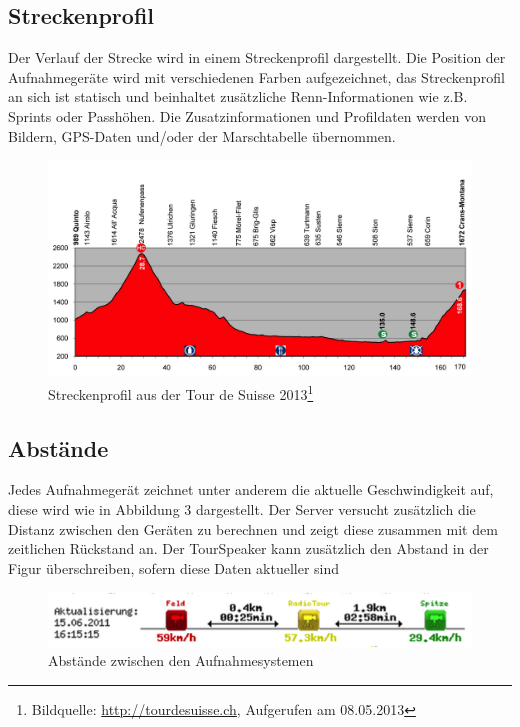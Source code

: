 \subsection{Streckenprofil}
Der Verlauf der Strecke wird in einem Streckenprofil dargestellt. Die Position der Aufnahmegeräte wird mit verschiedenen Farben aufgezeichnet, das Streckenprofil an sich ist statisch und beinhaltet zusätzliche Renn-Informationen wie z.B. Sprints oder Passhöhen. Die Zusatzinformationen und Profildaten werden von Bildern, GPS-Daten und/oder der Marschtabelle übernommen.
\begin{figure}[H]
	\centering
	\includegraphics[width=130mm]{images/streckenprofil.jpg}
	\caption{Streckenprofil aus der Tour de Suisse 2013\footnote{Bildquelle: \url{http://tourdesuisse.ch}, Aufgerufen am 08.05.2013}}
\end{figure}

\subsection{Abstände}
Jedes Aufnahmegerät zeichnet unter anderem die aktuelle Geschwindigkeit auf, diese wird wie in Abbildung 3 dargestellt. Der Server versucht zusätzlich die Distanz zwischen den Geräten zu berechnen und zeigt diese zusammen mit dem zeitlichen Rückstand an. Der TourSpeaker kann zusätzlich den Abstand in der Figur überschreiben, sofern diese Daten aktueller sind
\begin{figure}[H]
	\centering
	\includegraphics[width=130mm]{images/abstaende.png}
	\caption{Abstände zwischen den Aufnahmesystemen}
\end{figure}

